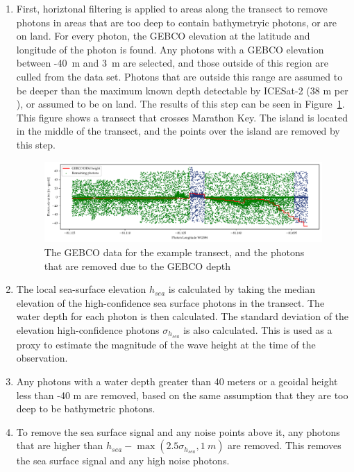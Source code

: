 \begin{enumerate}
    \item First, horiztonal filtering is applied to areas along the transect to remove photons in areas that are too deep to contain bathymetryic photons, or are on land. For every photon, the GEBCO elevation at the latitude and longitude of the photon is found. Any photons with a GEBCO elevation between -40~m and 3~m are selected, and those outside of this region are culled from the data set. Photons that are outside this range are assumed to be deeper than the maximum known depth detectable by ICESat-2 (38 m per \citeauthor{Parrish2019}), or assumed to be on land. The results of this step can be seen in Figure~\ref{fig:gebco_filtering}. This figure shows a transect that crosses Marathon Key. The island is located in the middle of the transect, and the points over the island are removed by this step.
    
    \begin{figure}[htbp]
        \centering
        \includegraphics[width=\textwidth]{figures/methodology_gebco_filtering.pdf}
        \caption{The GEBCO data for the example transect, and the photons that are removed due to the GEBCO depth}
        \label{fig:gebco_filtering}
    \end{figure}

    \item The local sea-surface elevation $h_{sea}$ is calculated by taking the median elevation of the  high-confidence sea surface photons in the transect. The water depth for each photon is then calculated. The standard deviation of the elevation high-confidence photons $\sigma_{h_{sea}}$ is also calculated. This is used as a proxy to estimate the magnitude of the wave height at the time of the observation.
    \item Any photons with a water depth greater than 40 meters or a geoidal height less than -40 m are removed, based on the same assumption that they are too deep to be bathymetric photons. 
    \item To remove the sea surface signal and any noise points above it, any photons that are higher than $h_{sea} - \max{(2.5\sigma_{h_{sea}},1~m)}$ are removed. This removes the sea surface signal and any high noise photons.
    

\end{enumerate}
